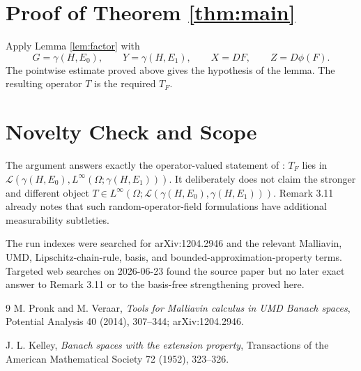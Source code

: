 \documentclass[11pt]{article}
\newcommand{\g}{\gamma}
\newcommand{\cL}{\mathcal L}
\newcommand{\1}{\mathbf 1}
\begin{document}
\section*{Proof of Theorem \ref{thm:main}}

Apply Lemma \ref{lem:factor} with
\[
  G=\g(H,E_0),\qquad Y=\g(H,E_1),\qquad
  X=DF,\qquad Z=D\phi(F).
\]
The pointwise estimate proved above gives the hypothesis of the lemma.  The
resulting operator \(T\) is the required \(T_F\).

\section*{Novelty Check and Scope}

The argument answers exactly the operator-valued statement of
\cite[Proposition 3.10]{PV}: \(T_F\) lies in
\(\cL(\g(H,E_0),L^\infty(\Omega;\g(H,E_1)))\).  It deliberately does not claim
the stronger and different object \(T\in L^\infty(\Omega;\cL(\g(H,E_0),
\g(H,E_1)))\).  Remark 3.11 already notes that such random-operator-field
formulations have additional measurability subtleties.

The run indexes were searched for arXiv:1204.2946 and the relevant Malliavin,
UMD, Lipschitz-chain-rule, basis, and bounded-approximation-property terms.
Targeted web searches on 2026-06-23 found the source paper but no later exact
answer to Remark 3.11 or to the basis-free strengthening proved here.

\begin{thebibliography}{9}
M. Pronk and M. Veraar,
\emph{Tools for Malliavin calculus in UMD Banach spaces},
Potential Analysis 40 (2014), 307--344; arXiv:1204.2946.

J. L. Kelley,
\emph{Banach spaces with the extension property},
Transactions of the American Mathematical Society 72 (1952), 323--326.
\end{thebibliography}
\end{document}
